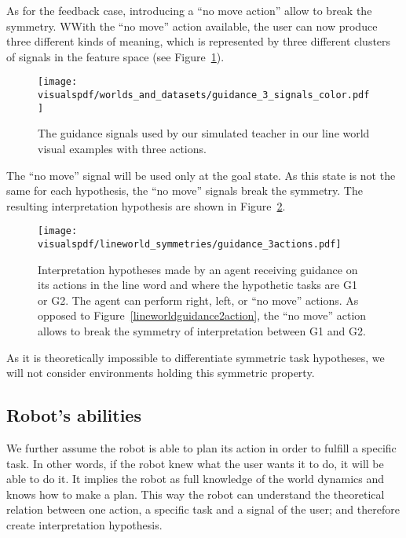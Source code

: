 As for the feedback case, introducing a ``no move action'' allow to break the symmetry. WWith the ``no move'' action available, the user can now produce three different kinds of meaning, which is represented by three different clusters of signals in the feature space (see Figure~\ref{fig:lineworldguidance3signals}). 

\begin{figure}[!htbp]
  \centering
  \texttt{[image: \\visualspdf/worlds\_and\_datasets/guidance\_3\_signals\_color.pdf]}
  \caption{The guidance signals used by our simulated teacher in our line world visual examples with three actions.}
  \label{fig:lineworldguidance3signals}
\end{figure}

The ``no move'' signal will be used only at the goal state. As this state is not the same for each hypothesis, the ``no move'' signals break the symmetry. The resulting interpretation hypothesis are shown in Figure~\ref{fig:lineworldguidance3action}.

\begin{figure}[!htbp]
  \centering
  \texttt{[image: \\visualspdf/lineworld\_symmetries/guidance\_3actions.pdf]}
  \caption{Interpretation hypotheses made by an agent receiving guidance on its actions in the line word and where the hypothetic tasks are G1 or G2. The agent can perform right, left, or ``no move'' actions. As opposed to Figure~\ref{lineworldguidance2action}, the ``no move'' action allows to break the symmetry of interpretation between G1 and G2.}
  \label{fig:lineworldguidance3action}
\end{figure}

\transition

As it is theoretically impossible to differentiate symmetric task hypotheses, we will not consider environments holding this symmetric property.

\subsection{Robot's abilities}

We further assume the robot is able to plan its action in order to fulfill a specific task. In other words, if the robot knew what the user wants it to do, it will be able to do it. It implies the robot as full knowledge of the world dynamics and knows how to make a plan. This way the robot can understand the theoretical relation between one action, a specific task and a signal of the user; and therefore create interpretation hypothesis.

